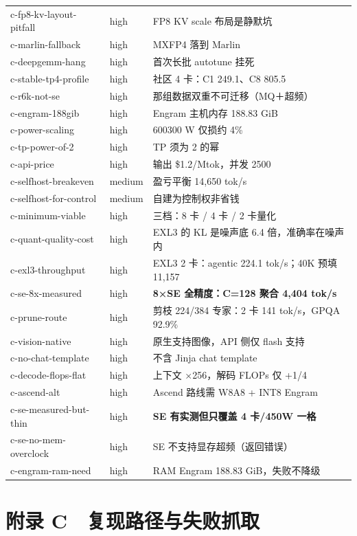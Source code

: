 \begin{table}[t]
\begin{tabularx}{\textwidth}{llX}
c-fp8-kv-layout-pitfall & high & FP8 KV scale 布局是静默坑 \\
c-marlin-fallback & high & MXFP4 落到 Marlin \\
c-deepgemm-hang & high & 首次长批 autotune 挂死 \\
c-stable-tp4-profile & high & 社区 4 卡：C1 249.1、C8 805.5 \\
c-r6k-not-se & high & 那组数据双重不可迁移（MQ＋超频） \\
c-engram-188gib & high & Engram 主机内存 188.83 GiB \\
c-power-scaling & high & 600\sym{→}{}300 W 仅损约 4\% \\
c-tp-power-of-2 & high & TP 须为 2 的幂 \\
c-api-price & high & 输出 \$1.2/Mtok，并发 2500 \\
c-selfhost-breakeven & medium & 盈亏平衡 14,650 tok/s \\
c-selfhost-for-control & medium & 自建为控制权非省钱 \\
c-minimum-viable & high & 三档：8 卡 / 4 卡 / 2 卡量化 \\
c-quant-quality-cost & high & EXL3 的 KL 是噪声底 6.4 倍，准确率在噪声内 \\
c-exl3-throughput & high & EXL3 2 卡：agentic 224.1 tok/s；40K 预填 11,157 \\
c-se-8x-measured & high & \textbf{8×SE 全精度：C=128 聚合 4,404 tok/s} \\
c-prune-route & high & 剪枝 224/384 专家：2 卡 141 tok/s，GPQA 92.9\% \\
c-vision-native & high & 原生支持图像，API 侧仅 flash 支持 \\
c-no-chat-template & high & 不含 Jinja chat template \\
c-decode-flops-flat & high & 上下文 ×256，解码 FLOPs 仅 +1/4 \\
c-ascend-alt & high & Ascend 路线需 W8A8 + INT8 Engram \\
c-se-measured-but-thin & high & \textbf{SE 有实测但只覆盖 4 卡/450W 一格} \\
c-se-no-mem-overclock & high & SE 不支持显存超频（返回错误） \\
c-engram-ram-need & high & RAM Engram 188.83 GiB，失败不降级 \\
\bottomrule
\end{tabularx}
\end{table}

\section{附录 C　复现路径与失败抓取}

